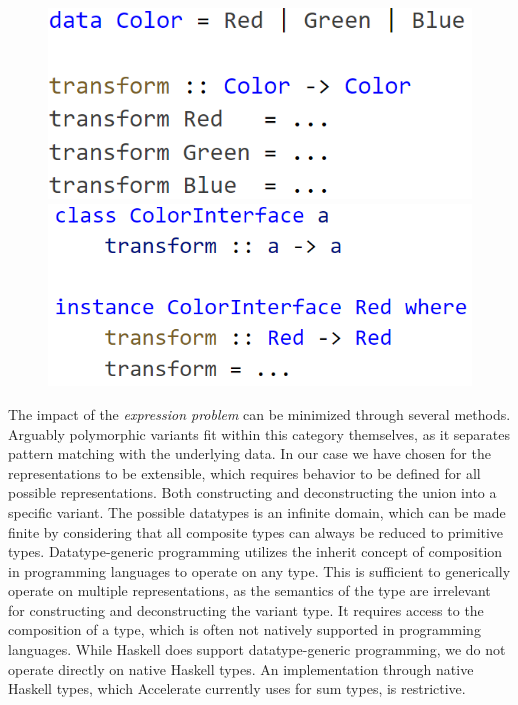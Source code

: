 \documentclass{article}
\begin{document}
\begin{figure}[ht]
    \centering
    \begin{minipage}{.5\textwidth}
        \hspace{1em}
        \includegraphics[scale=0.4]{CodeType16.png}
    \end{minipage}%
    \begin{minipage}{.5\textwidth}
        \hspace{1em}
        \includegraphics[scale=0.4]{CodeType17.png}
    \end{minipage}
\end{figure}

The impact of the {\it expression problem} can be minimized through several methods. 
Arguably polymorphic variants fit within this category themselves, as it separates pattern matching with the underlying data\cite{polymorphic-variants-expression-problem}.
In our case we have chosen for the representations to be extensible, which requires behavior to be defined for all possible representations.
Both constructing and deconstructing the union into a specific variant.
The possible datatypes is an infinite domain, which can be made finite by considering that all composite types can always be reduced to primitive types.
Datatype-generic programming utilizes the inherit concept of composition in programming languages to operate on any type.
This is sufficient to generically operate on multiple representations, as the semantics of the type are irrelevant for constructing and deconstructing the variant type.
It requires access to the composition of a type, which is often not natively supported in programming languages.
While Haskell does support datatype-generic programming, we do not operate directly on native Haskell types.
An implementation through native Haskell types, which Accelerate currently uses for sum types, is restrictive.
\end{document}
